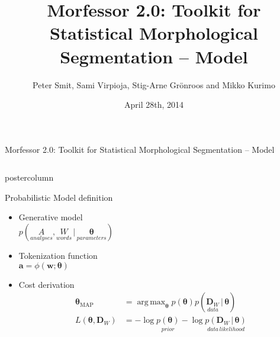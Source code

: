 \documentclass[final]{beamer} %
\title{Morfessor 2.0: Toolkit for Statistical Morphological Segmentation -- Model}
\author{Peter Smit, Sami Virpioja, Stig-Arne Gr\"onroos and Mikko Kurimo}
\institute[Aalto University]{Aalto University}
\date{April 28th, 2014}
\DeclareMathOperator*{\argmax}{arg\,max}
\newcommand{\seq}[1]{\boldsymbol{#1}}
\newcommand{\txt}[1]{\textrm{#1}}
\newcommand{\cost}{L}
\newcommand{\params}{\boldsymbol{\theta}}
\newcommand{\data}{\seq{D}}
\newcommand{\token}{\phi}
\newcommand{\vb}{\,|\,}
\begin{document}
  \begin{frame}{Morfessor 2.0: Toolkit for Statistical Morphological Segmentation -- Model} 
\begin{columns}

\begin{column}{.4\textwidth}
%            
%

      \begin{beamercolorbox}[center,wd=\textwidth]{postercolumn}
 \begin{block}{Probabilistic Model definition}
              \begin{itemize}
              \item Generative model\\
$p(\underset{analyses}{A}, \underset{words}{W} \vb \underset{parameters}{\params})$
		\item Tokenization function\\
 $\seq{a} = \token(\seq{w}; \params)$
		\item Cost derivation\\
\begin{align*}\params_{\txt{MAP}}%
&= \argmax_{\params} p(\params) p(\underset{data}{\data_W} \vb \params)\\
\cost(\params, \data_W) &= -\log \underset{prior}{p(\params)} - \log \underset{data\,likelihood}{p(\data_W \vb \params)}
\end{align*}
              \end{itemize}              
            \end{block}
            
	\end{beamercolorbox}


\end{column}
\end{columns}
\end{frame}
\end{document}

